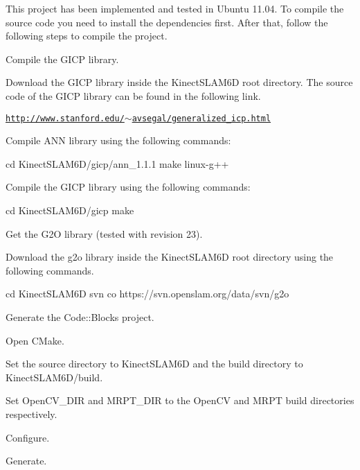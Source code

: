 This project has been implemented and tested in Ubuntu 11.04. To compile the source code you need to install the dependencies first. After that, follow the following steps to compile the project.
\begin{DoxyItemize}
\item Compile the GICP library.
\begin{DoxyEnumerate}
\item Download the GICP library inside the KinectSLAM6D root directory. The source code of the GICP library can be found in the following link. \par
 \href{http://www.stanford.edu/~avsegal/generalized_icp.html}{\tt http://www.stanford.edu/$\sim$avsegal/generalized\_\-icp.html}
\item Compile ANN library using the following commands: \par
 \begin{DoxyVerb}
cd KinectSLAM6D/gicp/ann_1.1.1
make linux-g++
\end{DoxyVerb}

\item Compile the GICP library using the following commands: \par
 \begin{DoxyVerb}
cd KinectSLAM6D/gicp
make
\end{DoxyVerb}

\end{DoxyEnumerate}
\end{DoxyItemize}


\begin{DoxyItemize}
\item Get the G2O library (tested with revision 23).
\begin{DoxyEnumerate}
\item Download the g2o library inside the KinectSLAM6D root directory using the following commands. \begin{DoxyVerb}
cd KinectSLAM6D
svn co https://svn.openslam.org/data/svn/g2o
\end{DoxyVerb}

\end{DoxyEnumerate}
\end{DoxyItemize}


\begin{DoxyItemize}
\item Generate the Code::Blocks project.
\begin{DoxyEnumerate}
\item Open CMake.
\item Set the source directory to KinectSLAM6D and the build directory to KinectSLAM6D/build.
\item Set OpenCV\_\-DIR and MRPT\_\-DIR to the OpenCV and MRPT build directories respectively.
\item Configure.
\item Generate.
\end{DoxyEnumerate}
\end{DoxyItemize}


